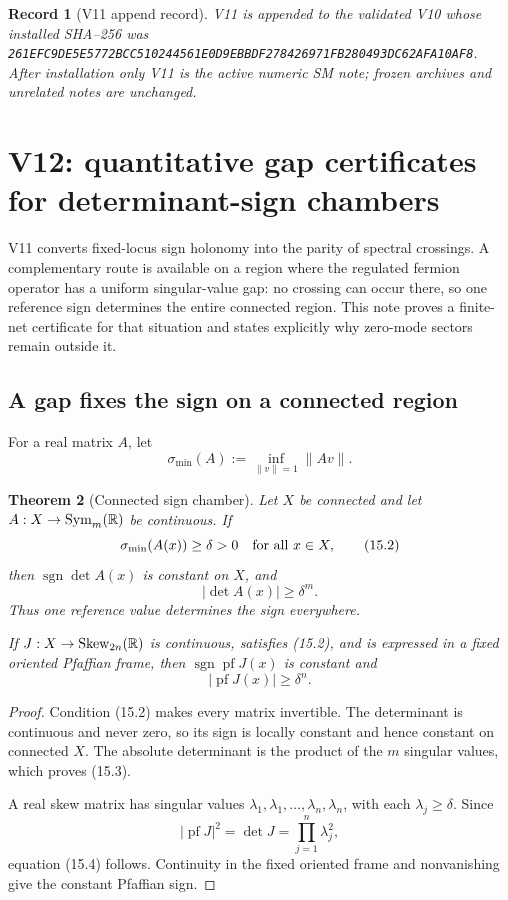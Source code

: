 \documentclass[11pt]{article}
\newtheorem{theorem}{Theorem}[section]
\newtheorem{record}[theorem]{Record}
\theoremstyle{remark}
\begin{document}
\begin{record}[V11 append record]
\label{rec:v19v11}
V11 is appended to the validated V10 whose installed SHA--256 was
\texttt{261EFC9DE5E5772BCC510244561E0D9EBBDF278426971FB280493DC62AFA10AF8}.
After installation only V11 is the active numeric SM note; frozen archives
and unrelated notes are unchanged.
\end{record}




\section{V12: quantitative gap certificates for determinant-sign chambers}
\label{sec:v19v12}

V11 converts fixed-locus sign holonomy into the parity of spectral
crossings.  A complementary route is available on a region where the
regulated fermion operator has a uniform singular-value gap: no crossing
can occur there, so one reference sign determines the entire connected
region.  This note proves a finite-net certificate for that situation and
states explicitly why zero-mode sectors remain outside it.

\subsection{A gap fixes the sign on a connected region}

For a real matrix \(A\), let
\[
 \sigma_{\min}(A):=\inf_{\|v\|=1}\|Av\|.                       \tag{15.1}
\]

\begin{theorem}[Connected sign chamber]
\label{thm:v19v12-chamber}
Let \(X\) be connected and let \(A:X\to{\rm Sym}_m(\mathbb R)\) be
continuous.  If
\[
 \sigma_{\min}(A(x))\geq\delta>0\quad\hbox{for all }x\in X,     \tag{15.2}
\]
then \(\operatorname{sgn}\det A(x)\) is constant on \(X\), and
\[
 |\det A(x)|\geq\delta^m.                                      \tag{15.3}
\]
Thus one reference value determines the sign everywhere.

If \(J:X\to{\rm Skew}_{2n}(\mathbb R)\) is continuous, satisfies (15.2),
and is expressed in a fixed oriented Pfaffian frame, then
\(\operatorname{sgn}\operatorname{pf}J(x)\) is constant and
\[
 |\operatorname{pf}J(x)|\geq\delta^n.                          \tag{15.4}
\]
\end{theorem}

\begin{proof}
Condition (15.2) makes every matrix invertible.  The determinant is
continuous and never zero, so its sign is locally constant and hence
constant on connected \(X\).  The absolute determinant is the product of
the \(m\) singular values, which proves (15.3).

A real skew matrix has singular values
\(\lambda_1,\lambda_1,\ldots,\lambda_n,\lambda_n\), with each
\(\lambda_j\geq\delta\).  Since
\[
 |\operatorname{pf}J|^2=\det J=\prod_{j=1}^n\lambda_j^2,
\]
equation (15.4) follows.  Continuity in the fixed oriented frame and
nonvanishing give the constant Pfaffian sign.
\end{proof}
\end{document}
